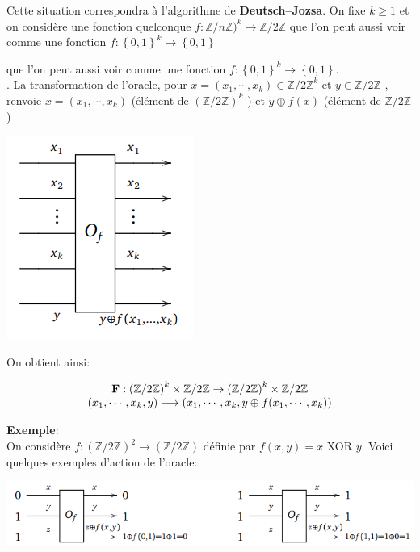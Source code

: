 \documentclass[12pt,openany]{report}
\begin{document}
Cette situation correspondra à l’algorithme de \textbf{Deutsch–Jozsa}.
On fixe $k \geq 1$ et on considère une fonction quelconque $f : \mathbb{Z}/n\mathbb{Z})^k \rightarrow \mathbb{Z}/2\mathbb{Z}$ que l'on peut aussi voir comme une fonction $ f:{\left\lbrace 0,1 \right\rbrace}^k \rightarrow \left\lbrace 0,1 \right\rbrace    $

 que l’on peut aussi voir comme
une fonction $ f:{ \left\lbrace 0,1 \right\rbrace}^k \rightarrow \left\lbrace 0,1\right\rbrace   $.\\
.
La transformation de l’oracle, pour $ x = (x_1
,\cdots , x_k
) \in {\mathbb{Z}/2\mathbb{Z}}^k$
et $ y \in  \mathbb{Z}/2\mathbb{Z} $ , renvoie $x = (x_1
, \cdots , x_k
)$
(élément de $(\mathbb{Z}/2\mathbb{Z})^k$
) et $ y \oplus f (x)$ (élément de $ \mathbb{Z}/2\mathbb{Z}$ )

\begin{center}
\includegraphics[scale=1]{./oracle2}

\end{center}
On obtient ainsi: 

\[  
 \left.
\begin{array}{ c  c }
\mathbf{F}: {(\mathbb{Z}/2\mathbb{Z})}^k \times \mathbb{Z}/2\mathbb{Z} \rightarrow {(\mathbb{Z}/2\mathbb{Z})}^k \times \mathbb{Z}/2\mathbb{Z}\\
(x_1,\cdots,x_k,y) \longmapsto (x_1,\cdots,x_k,y \oplus f(x_1,\cdots,x_k))

\end{array}
\right.
\]

\textbf{Exemple}: \\

On considère $ f : {(\mathbb{Z}/2\mathbb{Z})}^2 \rightarrow {(\mathbb{Z}/2\mathbb{Z})} $ définie par $ f(x,y)=x$ XOR $y $. Voici quelques exemples d’action de l’oracle:

\begin{center}
\includegraphics[scale=1]{./oracle3}
\end{center}
\end{document}
